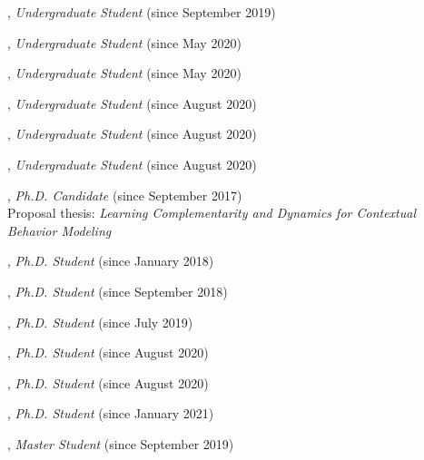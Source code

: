 \documentclass[10pt]{article}
\newenvironment{myindentpar}[1]%
{\begin{list}{}%
         {\setlength{\leftmargin}{#1}}%
         \item[]%
}
{\end{list}}
\newcounter{list}
\begin{document}
\begin{myindentpar}{0.75cm}

\hspace{-0.75cm}{\bf Bo Ni}, \textit{Undergraduate Student} (since September 2019)

\hspace{-0.75cm}{\bf Ann Hermann}, \textit{Undergraduate Student} (since May 2020)

\hspace{-0.75cm}{\bf Michael Lee}, \textit{Undergraduate Student} (since May 2020)

\hspace{-0.75cm}{\bf Joseph Kuebler}, \textit{Undergraduate Student} (since August 2020)

\hspace{-0.75cm}{\bf Facundo Munoz}, \textit{Undergraduate Student} (since August 2020)

\hspace{-0.75cm}{\bf Fangcong Yin}, \textit{Undergraduate Student} (since August 2020)

\hspace{-0.75cm}{\bf Daheng Wang}, \textit{Ph.D. Candidate} (since September 2017) \\
	Proposal thesis: \textit{Learning Complementarity and Dynamics for Contextual Behavior Modeling}

\hspace{-0.75cm}{\bf Qingkai Zeng}, \textit{Ph.D. Student} (since January 2018)

\hspace{-0.75cm}{\bf Tong Zhao}, \textit{Ph.D. Student} (since September 2018)

\hspace{-0.75cm}{\bf Wenhao Yu}, \textit{Ph.D. Student} (since July 2019)

\hspace{-0.75cm}{\bf Lingbo Tong}, \textit{Ph.D. Student} (since August 2020)

\hspace{-0.75cm}{\bf Mengxia Yu}, \textit{Ph.D. Student} (since August 2020)

\hspace{-0.75cm}{\bf Zhihan Zhang}, \textit{Ph.D. Student} (since January 2021)

\hspace{-0.75cm}{\bf Jianing Li}, \textit{Master Student} (since September 2019)

\end{myindentpar}
\end{document}
